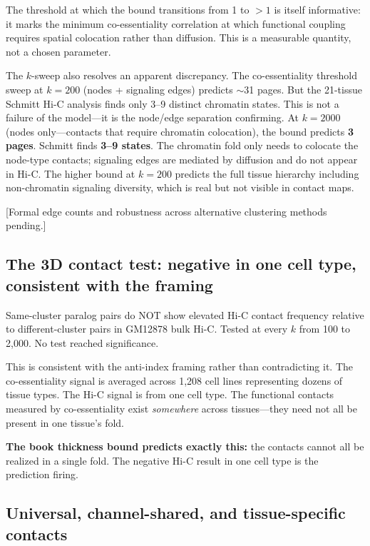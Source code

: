 \documentclass[11pt]{article}
\theoremstyle{definition}
\begin{document}
The threshold at which the bound transitions from 1 to $>1$ is itself informative: it marks the minimum co-essentiality correlation at which functional coupling requires spatial colocation rather than diffusion. This is a measurable quantity, not a chosen parameter.

The $k$-sweep also resolves an apparent discrepancy. The co-essentiality threshold sweep at $k{=}200$ (nodes + signaling edges) predicts $\sim$31 pages. But the 21-tissue Schmitt Hi-C analysis finds only 3--9 distinct chromatin states. This is not a failure of the model---it is the node/edge separation confirming. At $k{=}2000$ (nodes only---contacts that require chromatin colocation), the bound predicts \textbf{3 pages}. Schmitt finds \textbf{3--9 states}. The chromatin fold only needs to colocate the node-type contacts; signaling edges are mediated by diffusion and do not appear in Hi-C. The higher bound at $k{=}200$ predicts the full tissue hierarchy including non-chromatin signaling diversity, which is real but not visible in contact maps.

[Formal edge counts and robustness across alternative clustering methods pending.]

\subsection{The 3D contact test: negative in one cell type, consistent with the framing}

Same-cluster paralog pairs do NOT show elevated Hi-C contact frequency relative to different-cluster pairs in GM12878 bulk Hi-C. Tested at every $k$ from 100 to 2,000. No test reached significance.

This is consistent with the anti-index framing rather than contradicting it. The co-essentiality signal is averaged across 1,208 cell lines representing dozens of tissue types. The Hi-C signal is from one cell type. The functional contacts measured by co-essentiality exist \emph{somewhere} across tissues---they need not all be present in one tissue's fold.

\textbf{The book thickness bound predicts exactly this:} the contacts cannot all be realized in a single fold. The negative Hi-C result in one cell type is the prediction firing.

\subsection{Universal, channel-shared, and tissue-specific contacts}
\end{document}

